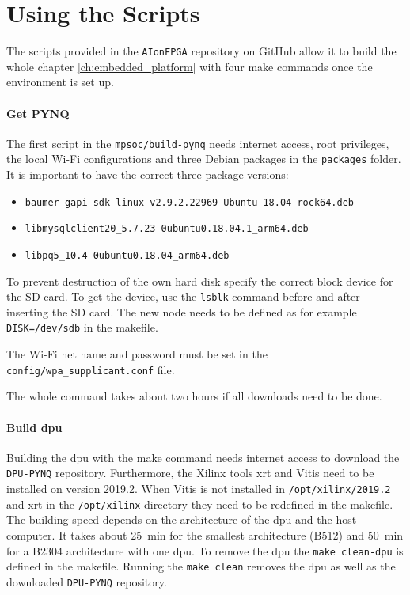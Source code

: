\section{Using the Scripts}
\label{sec:embedded_platform:using_scripts}

The scripts provided in the \texttt{AIonFPGA} repository on GitHub allow it to build the whole chapter \ref{ch:embedded_platform} with four make commands once the environment is set up.

\paragraph{Get PYNQ}
The first script in the \texttt{mpsoc/build-pynq} needs internet access, root privileges, the local Wi-Fi configurations and three Debian packages in the \texttt{packages} folder.
It is important to have the correct three package versions:
\begin{itemize}
	 \item \texttt{baumer-gapi-sdk-linux-v2.9.2.22969-Ubuntu-18.04-rock64.deb}
	 \item \texttt{libmysqlclient20\_5.7.23-0ubuntu0.18.04.1\_arm64.deb}
	 \item \texttt{libpq5\_10.4-0ubuntu0.18.04\_arm64.deb}
\end{itemize}

To prevent destruction of the own hard disk specify the correct block device for the SD card.
To get the device, use the \texttt{lsblk} command before and after inserting the SD card.
The new node needs to be defined as for example \texttt{DISK=/dev/sdb} in the makefile.

The Wi-Fi net name and password must be set in the \texttt{config/wpa\_supplicant.conf} file.

The whole command takes about two hours if all downloads need to be done.

\paragraph{Build \acrshort{dpu}}
Building the \acrshort{dpu} with the make command needs internet access to download the \texttt{DPU-PYNQ} repository.
Furthermore, the Xilinx tools \acrshort{xrt} and Vitis need to be installed on version 2019.2.
When Vitis is not installed in \texttt{/opt/xilinx/2019.2} and \acrshort{xrt} in the \texttt{/opt/xilinx} directory they need to be redefined in the makefile.
The building speed depends on the architecture of the \acrshort{dpu} and the host computer.
It takes about \SI{25}{min} for the smallest architecture (B512) and \SI{50}{min} for a B2304 architecture with one \acrshort{dpu}.
To remove the \acrshort{dpu} the \texttt{make clean-dpu} is defined in the makefile.
Running the \texttt{make clean} removes the \acrshort{dpu} as well as the downloaded \texttt{DPU-PYNQ} repository.

